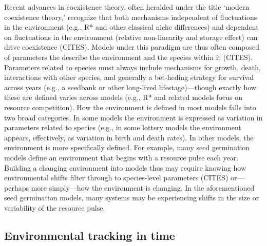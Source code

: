 \documentclass[11pt,letterpaper]{article}
\begin{document}
Recent advances in coexistence theory, often heralded under the title `modern coexistence theory,' recognize that both mechanisms independent of fluctuations in the environment (e.g., R* and other classical niche differences) and dependent on fluctuations in the environment (relative non-linearity and storage effect) can drive coexistence (CITES). Models under this paradigm are thus often composed of parameters the describe the environment and the species within it (CITES). Parameters related to species must always include mechanisms for growth, death, interactions with other species, and generally a bet-heding strategy for survival across years (e.g., a seedbank or other long-lived lifestage)---though exactly how these are defined varies across models (e.g., R* and related models focus on resource competition). How the environment is defined in most models falls into two broad categories. In some models the environment is expressed as variation in parameters related to species (e.g., in some lottery models the environment appears, effectively, as variation in birth and death rates). In other models, the environment is more specifically defined. For example, many seed germination models define an environment that begins with a resource pulse each year. Building a changing environment into models thus may require knowing how environmental shifts filter through to species-level parameters (CITES) or---perhaps more simply---how the environment is changing. In the aforementioned seed germination models, many systems may be experiencing shifts in the size or variability of the resource pulse.\\

\subsection{Environmental tracking in time}
\end{document}
